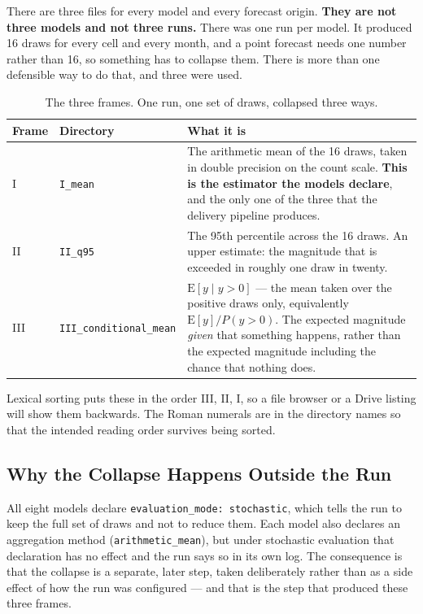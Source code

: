 There are three files for every model and every forecast origin. \textbf{They are not three models
and not three runs.} There was one run per model. It produced 16 draws for every cell and every
month, and a point forecast needs one number rather than 16, so something has to collapse them.
There is more than one defensible way to do that, and three were used.

\begin{table}[h!]
\centering
\small
\renewcommand{\arraystretch}{1.3}
\caption{The three frames. One run, one set of draws, collapsed three ways.}
\label{tab:frames}
\begin{tabular}{@{}p{1.1cm}p{3.6cm}p{9.3cm}@{}}
\toprule
\textbf{Frame} & \textbf{Directory} & \textbf{What it is} \\ \midrule
I   & \texttt{I\_mean} &
  The arithmetic mean of the 16 draws, taken in double precision on the count scale.
  \textbf{This is the estimator the models declare}, and the only one of the three that the
  delivery pipeline produces. \\ \addlinespace
II  & \texttt{II\_q95} &
  The 95th percentile across the 16 draws. An upper estimate: the magnitude that is exceeded in
  roughly one draw in twenty. \\ \addlinespace
III & \texttt{III\_conditional\_mean} &
  $\mathrm{E}[y \mid y > 0]$ --- the mean taken over the positive draws only, equivalently
  $\mathrm{E}[y] / P(y>0)$. The expected magnitude \emph{given} that something happens, rather
  than the expected magnitude including the chance that nothing does. \\
\bottomrule
\end{tabular}
\end{table}

\noindent Lexical sorting puts these in the order III, II, I, so a file browser or a Drive listing
will show them backwards. The Roman numerals are in the directory names so that the intended
reading order survives being sorted.

\subsection*{Why the Collapse Happens Outside the Run}

All eight models declare \texttt{evaluation\_mode: stochastic}, which tells the run to keep the
full set of draws and not to reduce them. Each model also declares an aggregation method
(\texttt{arithmetic\_mean}), but under stochastic evaluation that declaration has no effect and the
run says so in its own log. The consequence is that the collapse is a separate, later step, taken
deliberately rather than as a side effect of how the run was configured --- and that is the step
that produced these three frames.

